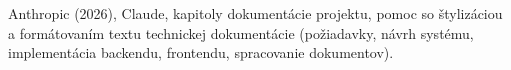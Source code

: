 \begin{trivlist}
\item Anthropic (2026), Claude, kapitoly dokumentácie projektu, pomoc so štylizáciou a formátovaním textu technickej dokumentácie (požiadavky, návrh systému, implementácia backendu, frontendu, spracovanie dokumentov).

\end{trivlist}
